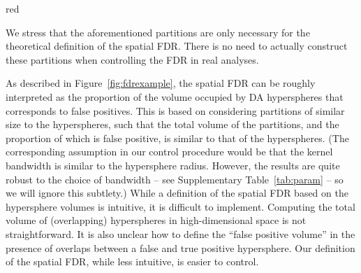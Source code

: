 \documentclass{article}
\begin{document}
\begin{color}{red}

We stress that the aforementioned partitions are only necessary for the theoretical definition of the spatial FDR.
There is no need to actually construct these partitions when controlling the FDR in real analyses.

As described in Figure~\ref{fig:fdrexample}, the spatial FDR can be roughly interpreted as the proportion of the volume occupied by DA hyperspheres that corresponds to false positives.
This is based on considering partitions of similar size to the hyperspheres, such that the total volume of the partitions, and the proportion of which is false positive, is similar to that of the hyperspheres.
(The corresponding assumption in our control procedure would be that the kernel bandwidth is similar to the hypersphere radius.
However, the results are quite robust to the choice of bandwidth -- see Supplementary Table~\ref{tab:param} -- so we will ignore this subtlety.)
While a definition of the spatial FDR based on the hypersphere volumes is intuitive, it is difficult to implement.
Computing the total volume of (overlapping) hyperspheres in high-dimensional space is not straightforward.
It is also unclear how to define the ``false positive volume'' in the presence of overlaps between a false and true positive hypersphere.
Our definition of the spatial FDR, while less intuitive, is easier to control.
\end{color}
\end{document}
